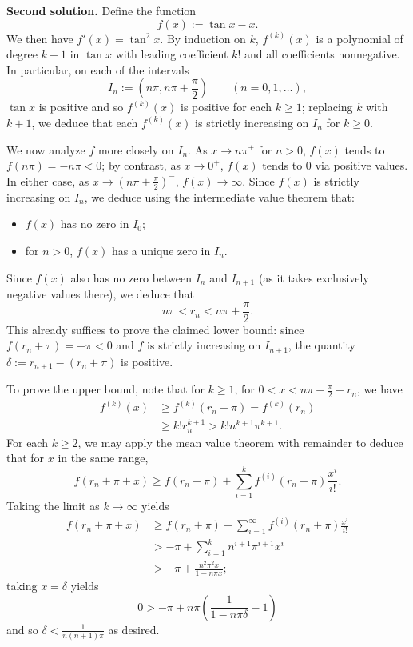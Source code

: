 \documentclass[amssymb,twocolumn,pra,10pt,aps]{revtex4-1}
\begin{document}
\begin{itemize}
\noindent
\textbf{Second solution.}
Define the function 
\[
f(x) := \tan x - x.
\]
We then have $f'(x) = \tan^2 x$.
By induction on $k$, $f^{(k)}(x)$ is a polynomial of degree $k+1$ in $\tan x$
with leading coefficient $k!$ and all coefficients nonnegative. In particular, on each of the intervals
\[
I_n := \left(n \pi, n \pi + \frac{\pi}{2} \right)  \qquad (n=0,1,\dots),
\]
$\tan x$ is positive
and so $f^{(k)}(x)$ is positive for each $k \geq 1$; replacing $k$ with $k+1$, we deduce that each $f^{(k)}(x)$ is strictly increasing on $I_n$ for $k \geq 0$.

We now analyze $f$ more closely on $I_n$.
As $x \to n\pi^+$ for $n>0$, $f(x)$ tends to $f(n\pi) = -n\pi < 0$;
by contrast, as $x \to 0^+$, $f(x)$ tends to 0 via positive values.
In either case, as $x \to (n \pi + \frac{\pi}{2})^-$, $f(x) \to \infty$.
Since $f(x)$ is strictly increasing on $I_n$, we deduce using the intermediate value theorem that:
\begin{itemize}
\item
$f(x)$ has no zero in $I_0$;
\item
for $n > 0$, $f(x)$ has a unique zero in $I_n$.
\end{itemize}
Since $f(x)$ also has no zero between $I_n$ and $I_{n+1}$ (as it takes exclusively negative values there), we deduce that
\[
n\pi < r_n < n \pi + \frac{\pi}{2}.
\]
This already suffices to prove the claimed lower bound: since
$f(r_n+\pi) = - \pi < 0$ and $f$ is strictly increasing on $I_{n+1}$, 
the quantity $\delta := r_{n+1} - (r_n + \pi)$ is positive.

To prove the upper bound, note that for $k \geq 1$,
for $0 < x < n\pi + \frac{\pi}{2}-r_n$, we have
\begin{align*}
f^{(k)}(x) & \geq f^{(k)}(r_n + \pi) = f^{(k)}(r_n) \\
&\geq k! r_n^{k+1} > k! n^{k+1} \pi^{k+1}.
\end{align*}
For each $k \geq 2$, we may apply the mean value theorem with remainder to deduce that for $x$ in the same range,
\[
f(r_n+\pi+x)\geq f(r_n+\pi) + \sum_{i=1}^k f^{(i)}(r_n+\pi) \frac{x^i}{i!}.
\]
Taking the limit as $k \to \infty$ yields
\begin{align*}
f(r_n + \pi + x) &\geq f(r_n+\pi) + \sum_{i=1}^\infty f^{(i)}(r_n+\pi) \frac{x^i}{i!} \\
& > -\pi + \sum_{i=1}^k n^{i+1} \pi^{i+1} x^i \\
&> - \pi + \frac{n^2\pi^2 x}{1-n \pi x};
\end{align*}
taking $x = \delta$ yields
\[
0 > -\pi + n \pi \left(\frac{1}{1-n \pi \delta} - 1\right)
\]
and so $\delta < \frac{1}{n(n+1)\pi}$ as desired.


\end{itemize}
\end{document}
